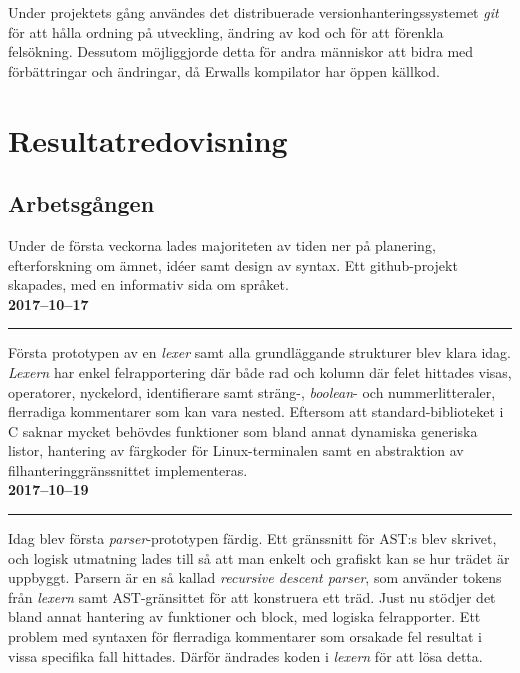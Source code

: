 \documentclass{theme}
\begin{document}
Under projektets gång användes det distribuerade versionhanteringssystemet
\textit{git} för att hålla ordning på utveckling, ändring av kod och för att
förenkla felsökning. Dessutom möjliggjorde detta för andra människor att bidra
med förbättringar och ändringar, då Erwalls kompilator har öppen källkod.

\section{Resultatredovisning}

\subsection{Arbetsgången}

Under de första veckorna lades majoriteten av tiden ner på planering, 
efterforskning om ämnet, idéer samt design av syntax. Ett github-projekt 
skapades, med en informativ sida om språket. \\

\noindent\textbf{2017--10--17}\\
\noindent\rule{\textwidth}{1pt}

\noindent
Första prototypen av en \textit{lexer} samt alla grundläggande strukturer blev
klara idag. \textit{Lexern} har enkel felrapportering där både rad och kolumn
där felet hittades visas, operatorer, nyckelord, identifierare samt sträng-,
\textit{boolean}- och nummerlitteraler, flerradiga kommentarer som kan vara
nested. Eftersom att standard-biblioteket i C saknar mycket behövdes 
funktioner som bland annat dynamiska generiska listor, hantering av 
färgkoder för Linux-terminalen samt en abstraktion av filhanteringgränssnittet 
implementeras. \\

\noindent\textbf{2017--10--19}\\
\noindent\rule{\textwidth}{1pt}

\noindent
Idag blev första \textit{parser}-prototypen färdig. Ett gränssnitt för AST:s 
blev skrivet, och logisk utmatning lades till så att man enkelt och grafiskt kan
se hur trädet är uppbyggt. Parsern är en så kallad \textit{recursive descent
parser}, som använder tokens från \textit{lexern} samt AST-gränsittet för att
konstruera ett träd. Just nu stödjer det bland annat hantering av funktioner och
block, med logiska felrapporter. Ett problem med syntaxen för flerradiga
kommentarer som orsakade fel resultat i vissa specifika fall hittades. Därför
ändrades koden i \textit{lexern} för att lösa detta.  \\
\end{document}
